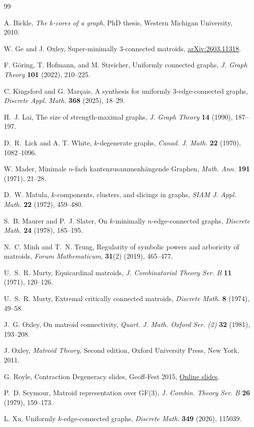 \documentclass{amsart}
\theoremstyle{definition}
\theoremstyle{remark}
\numberwithin{equation}{section}
\begin{document}
\begin{thebibliography}{99}

 A. Bickle, {\em The $k$-cores of a graph}, PhD thesis, Western Michigan University, 2010.

W. Ge and J. Oxley, Super-minimally $3$-connected matroids,
\href{https://arxiv.org/abs/2603.11318}{arXiv:2603.11318}.

F. G{\"o}ring, T. Hofmann, and M. Streicher, Uniformly connected graphs, {\em J. Graph Theory} {\bf 101} (2022), 210--225.

C. Kingsford and G. Mar{\c{c}}ais, A synthesis for uniformly $3$-edge-connected graphs, {\em Discrete Appl. Math.} {\bf 368} (2025), 18--29.

 H.~J. Lai, The size of strength-maximal graphs, {\em J. Graph Theory} {\bf 14} (1990), 187--197.

 D.~R.~Lick and A. T. White, $k$-degenerate graphs, {\em Canad. J. Math.} {\bf 22} (1970), 1082--1096.

 W. Mader, Minimale $n$-fach kantenzusammenh\"{a}ngende Graphen, {\em Math. Ann.} {\bf 191} (1971), 21--28.

 D.~W. Matula, $k$-components, clusters, and slicings in graphs, {\em SIAM J. Appl. Math.} {\bf 22} (1972), 459--480.

S.~B. Maurer and P.~J. Slater, On $k$-minimally $n$-edge-connected graphs, {\em Discrete Math.} {\bf 24} (1978), 185--195.

 N.~C. Minh and T.~N. Trung, Regularity of symbolic powers and arboricity of matroids, {\em Forum Mathematicum},  {\bf 31}(2) (2019), 465--477.

 U.~S.~R. Murty, Equicardinal matroids, {\em J. Combinatorial Theory Ser. B} {\bf 11} (1971), 120--126.

 U.~S.~R. Murty, Extremal critically connected matroids, {\em Discrete Math.} {\bf 8} (1974), 49--58.


 J.~G. Oxley, On matroid connectivity, {\em Quart. J. Math. Oxford Ser. (2)} {\bf 32} (1981), 193--208.

 J. Oxley, {\em Matroid Theory}, Second edition, Oxford University Press, New York, 2011.

 G. Royle, Contraction Degeneracy slides, Geoff-Fest 2015, \href{https://sms.wgtn.ac.nz/foswiki/pub/Events/GeoffWhittleConference/Programme/GR.pdf}{Online slides}.

 P.~D. Seymour, Matroid representation over GF(3), {\em J. Combin. Theory Ser. B} {\bf 26} (1979), 159--173.

L. Xu, Uniformly $k$-edge-connected graphs, {\em Discrete Math.} {\bf 349} (2026), 115039.

\end{thebibliography}
\end{document}
